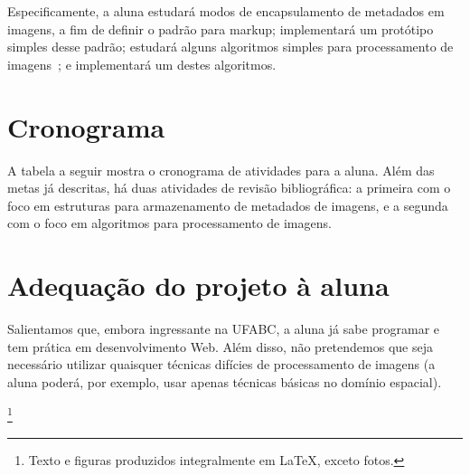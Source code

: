 \documentclass{article}
\newcommand\blfootnote[1]{%
  \begingroup
  \renewcommand\thefootnote{}\footnote{#1}%
  \addtocounter{footnote}{-1}%
  \endgroup
}
\begin{document}
Especificamente, a aluna estudará modos de encapsulamento de metadados
em imagens, a fim de definir o padrão para markup; implementará um
protótipo simples desse padrão; estudará alguns algoritmos simples
para processamento de imagens~\cite{gonzalez,burger}; e implementará um
destes algoritmos.


\section{Cronograma}

A tabela a seguir mostra o cronograma de atividades para a aluna. Além
das metas já descritas, há duas atividades de revisão bibliográfica: a
primeira com o foco em estruturas para armazenamento de metadados de
imagens, e a segunda com o foco em algoritmos para processamento de
imagens.

\begin{center}
\end{center}


\section{Adequação do projeto à aluna}

Salientamos que, embora ingressante na UFABC, a aluna já sabe
programar e tem prática em desenvolvimento Web. Além disso,
não pretendemos que seja necessário utilizar quaisquer técnicas difícies
de processamento de imagens (a aluna poderá, por exemplo, usar apenas
técnicas básicas no domínio espacial).

\printbibliography

\blfootnote{Texto e figuras produzidos integralmente em \LaTeX, exceto
  fotos.}
\end{document}
